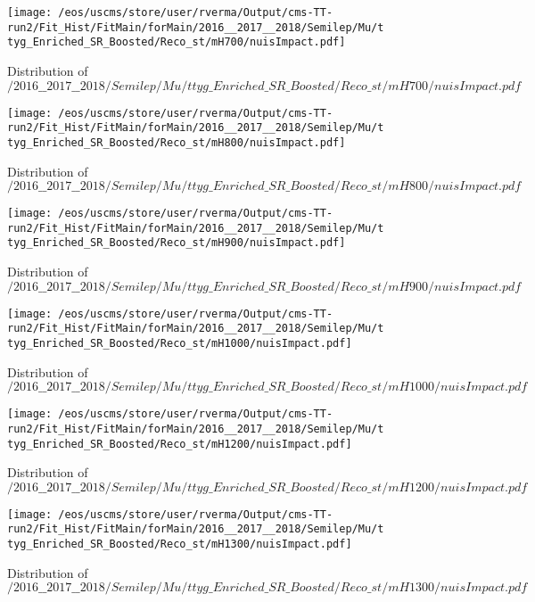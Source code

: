 \begin{figure}
\centering
\texttt{[image: /eos/uscms/store/user/rverma/Output/cms-TT-run2/Fit\_Hist/FitMain/forMain/2016\_\_2017\_\_2018/Semilep/Mu/ttyg\_Enriched\_SR\_Boosted/Reco\_st/mH700/nuisImpact.pdf]}
\caption{Distribution of $/2016\_\_2017\_\_2018/Semilep/Mu/ttyg\_Enriched\_SR\_Boosted/Reco\_st/mH700/nuisImpact.pdf$}
\end{figure}

\begin{figure}
\centering
\texttt{[image: /eos/uscms/store/user/rverma/Output/cms-TT-run2/Fit\_Hist/FitMain/forMain/2016\_\_2017\_\_2018/Semilep/Mu/ttyg\_Enriched\_SR\_Boosted/Reco\_st/mH800/nuisImpact.pdf]}
\caption{Distribution of $/2016\_\_2017\_\_2018/Semilep/Mu/ttyg\_Enriched\_SR\_Boosted/Reco\_st/mH800/nuisImpact.pdf$}
\end{figure}

\begin{figure}
\centering
\texttt{[image: /eos/uscms/store/user/rverma/Output/cms-TT-run2/Fit\_Hist/FitMain/forMain/2016\_\_2017\_\_2018/Semilep/Mu/ttyg\_Enriched\_SR\_Boosted/Reco\_st/mH900/nuisImpact.pdf]}
\caption{Distribution of $/2016\_\_2017\_\_2018/Semilep/Mu/ttyg\_Enriched\_SR\_Boosted/Reco\_st/mH900/nuisImpact.pdf$}
\end{figure}

\begin{figure}
\centering
\texttt{[image: /eos/uscms/store/user/rverma/Output/cms-TT-run2/Fit\_Hist/FitMain/forMain/2016\_\_2017\_\_2018/Semilep/Mu/ttyg\_Enriched\_SR\_Boosted/Reco\_st/mH1000/nuisImpact.pdf]}
\caption{Distribution of $/2016\_\_2017\_\_2018/Semilep/Mu/ttyg\_Enriched\_SR\_Boosted/Reco\_st/mH1000/nuisImpact.pdf$}
\end{figure}

\begin{figure}
\centering
\texttt{[image: /eos/uscms/store/user/rverma/Output/cms-TT-run2/Fit\_Hist/FitMain/forMain/2016\_\_2017\_\_2018/Semilep/Mu/ttyg\_Enriched\_SR\_Boosted/Reco\_st/mH1200/nuisImpact.pdf]}
\caption{Distribution of $/2016\_\_2017\_\_2018/Semilep/Mu/ttyg\_Enriched\_SR\_Boosted/Reco\_st/mH1200/nuisImpact.pdf$}
\end{figure}

\begin{figure}
\centering
\texttt{[image: /eos/uscms/store/user/rverma/Output/cms-TT-run2/Fit\_Hist/FitMain/forMain/2016\_\_2017\_\_2018/Semilep/Mu/ttyg\_Enriched\_SR\_Boosted/Reco\_st/mH1300/nuisImpact.pdf]}
\caption{Distribution of $/2016\_\_2017\_\_2018/Semilep/Mu/ttyg\_Enriched\_SR\_Boosted/Reco\_st/mH1300/nuisImpact.pdf$}
\end{figure}

